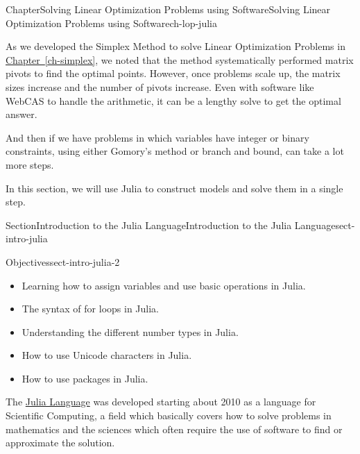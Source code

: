 \documentclass[oneside,10pt,]{book}
\newcommand{\xreffont}{\relax}
\numberwithin{equation}{section}
\begin{document}
%
%
\typeout{************************************************}
\typeout{************************************************}
%
\begin{chapterptx}{Chapter}{Solving Linear Optimization Problems using Software}{}{Solving Linear Optimization Problems using Software}{}{}{ch-lop-julia}
\renewcommand*{\chaptername}{Chapter}
\begin{introduction}{}%
As we developed the Simplex Method to solve Linear Optimization Problems in \hyperref[ch-simplex]{Chapter~{\xreffont\ref{ch-simplex}}}, we noted that the method systematically performed matrix pivots to find the optimal points. However, once problems scale up, the matrix sizes increase and the number of pivots increase.  Even with software like WebCAS to handle the arithmetic, it can be a lengthy solve to get the optimal answer.%
\par
And then if we have problems in which variables have integer or binary constraints, using either Gomory's method or branch and bound, can take a lot more steps.%
\par
In this section, we will use Julia to construct models and solve them in a single step.%
\end{introduction}%
%
%
\typeout{************************************************}
\typeout{************************************************}
%
\begin{sectionptx}{Section}{Introduction to the Julia Language}{}{Introduction to the Julia Language}{}{}{sect-intro-julia}
\begin{objectives}{Objectives}{sect-intro-julia-2}
%
\begin{itemize}[label=\textbullet]
\item{}Learning how to assign variables and use basic operations in Julia.%
\item{}The syntax of for loops in Julia.%
\item{}Understanding the different number types in Julia.%
\item{}How to use Unicode characters in Julia.%
\item{}How to use packages in Julia.%
\end{itemize}
\end{objectives}
\begin{introduction}{}%
The \href{julialang.org}{Julia Language} was developed starting about 2010 as a language for Scientific Computing, a field which basically covers how to solve problems in mathematics and the sciences which often require the use of software to find or approximate the solution.%

\end{introduction}
\end{sectionptx}
\end{chapterptx}
\end{document}
